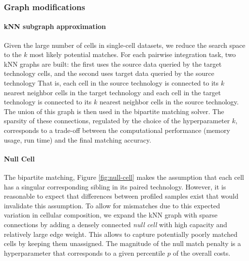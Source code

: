 \subsubsection{Graph modifications}

\paragraph{kNN subgraph approximation}
Given the large number of cells in single-cell datasets, we reduce the search space to the $k$ most likely potential matches.
For each pairwise integration task, two kNN graphs are built: the first uses the source data queried by the target technology cells, and the second uses target data queried by the source technology
That is, each cell in the source technology is connected to its $k$ nearest neighbor cells in the target technology and each cell in the target technology is connected to its $k$ nearest neighbor cells in the source technology.
The union of this graph is then used in the bipartite matching solver.
The sparsity of these connections, regulated by the choice of the hyperparameter $k$, corresponds to a trade-off between the computational performance (memory usage, run time) and the final matching accuracy.

\paragraph{Null Cell}
The bipartite matching, Figure \ref{fig:null-cell} makes the assumption that each cell has a singular corresponding sibling in its paired technology.
However, it is reasonable to expect that differences between profiled samples exist that would invalidate this assumption.
To allow for mismatches due to this expected variation in cellular composition,
we expand the kNN graph with sparse connections by adding a densely connected \textit{null cell} with high capacity and relatively large edge weight. 
This allows to capture potentially poorly matched cells by keeping them unassigned.
The magnitude of the null match penalty is a hyperparameter that corresponds to a given percentile $p$ of the overall costs.

